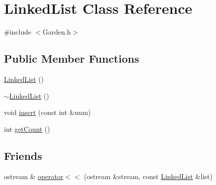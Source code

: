 \hypertarget{class_linked_list}{\section{Linked\-List Class Reference}
\label{class_linked_list}
}


{\ttfamily \#include $<$Garden.\-h$>$}

\subsection*{Public Member Functions}
\begin{DoxyCompactItemize}
\item 
\hyperlink{class_linked_list_afe7f78983e173f8018927cf2ad11a5aa}{Linked\-List} ()
\item 
\hyperlink{class_linked_list_a35811ed58ff0d8d9cc9b309b8d8f5111}{$\sim$\-Linked\-List} ()
\item 
void \hyperlink{class_linked_list_a740623dd34e8f4e6436dcf7db241dff8}{insert} (const int \&num)
\item 
int \hyperlink{class_linked_list_aa0d6a41e639302a3ed5b31e5d0bba90f}{get\-Count} ()
\end{DoxyCompactItemize}
\subsection*{Friends}
\begin{DoxyCompactItemize}
\item 
ostream \& \hyperlink{class_linked_list_a749151afaab7b3076518a617ff9d4c6c}{operator$<$$<$} (ostream \&stream, const \hyperlink{class_linked_list}{Linked\-List} \&list)
\end{DoxyCompactItemize}


